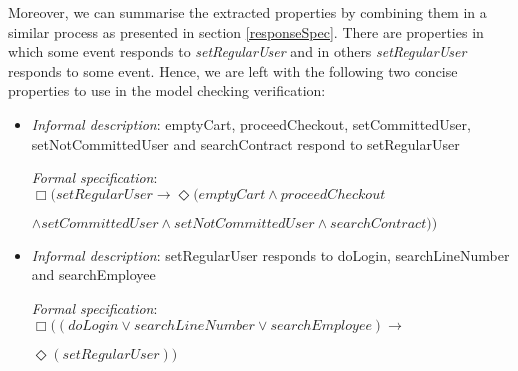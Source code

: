 Moreover, we can summarise the extracted properties by combining them in a similar process as presented in section \ref{responseSpec}. There are properties in which some event responds to \textit{setRegularUser} and in others \textit{setRegularUser} responds to some event. Hence, we are left with the following two concise properties to use in the model checking verification:

\begin{itemize}

\item \textit{Informal description}: emptyCart, proceedCheckout, setCommittedUser, setNotCommittedUser and searchContract respond to setRegularUser

\textit{Formal specification}: $\Box(setRegularUser \rightarrow \Diamond(emptyCart \wedge proceedCheckout$

$ \wedge setCommittedUser \wedge setNotCommittedUser \wedge searchContract))$

\item \textit{Informal description}: setRegularUser responds to doLogin, searchLineNumber and searchEmployee

\textit{Formal specification}: $\Box ((doLogin \vee searchLineNumber \vee searchEmployee) \rightarrow $

$\Diamond(setRegularUser))$

\end{itemize}

\iffalse
\begin{table}[h]
\begin{center}
\begin{tabular}{|p{7cm}|p{10cm}|}

\hline

Informal description & Formal specification \\ \hline

emptyCart, proceedCheckout, setCommittedUser, setNotCommittedUser and searchContract respond to setRegularUser & $\Box (setRegularUser \rightarrow \Diamond (emptyCart \wedge proceedCheckout \wedge setCommittedUser \wedge setNotCommittedUser \wedge searchContract))$ \\ \hline
setRegularUser responds to doLogin, searchLineNumber and searchEmployee & $\Box ((doLogin \vee searchLineNumber \vee searchEmployee) \rightarrow \Diamond(setRegularUser))$ \\

\hline
\end{tabular}
\end{center}
\caption{Combined properties from \ref{specificProperties}}
\label{specificPropertiesCombined}
\end{table}
\fi
